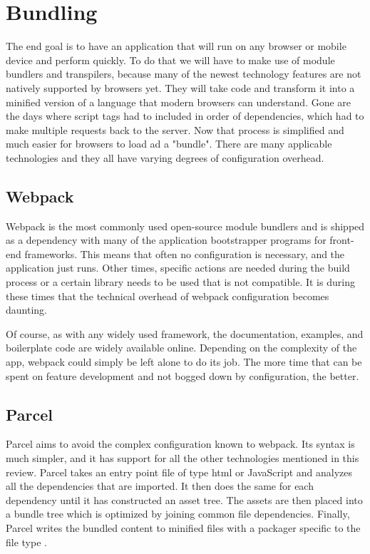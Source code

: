 \documentclass[draftclsnofoot,onecolumn,journal,letterpaper,compsoc,10pt]{IEEEtran}
\begin{document}
    \section{Bundling}
    The end goal is to have an application that will run on any browser or mobile device and perform quickly. To do that we will have to make use of module bundlers and transpilers, because many of the newest technology features are not natively supported by browsers yet. They will take code and transform it into a minified version of a language that modern browsers can understand. Gone are the days where script tags had to included in order of dependencies, which had to make multiple requests back to the server. Now that process is simplified and much easier for browsers to load ad a "bundle". There are many applicable technologies and they all have varying degrees of configuration overhead. 
        \subsection{Webpack}
        Webpack is the most commonly used open-source module bundlers and is shipped as a dependency with many of the application bootstrapper programs for front-end frameworks. This means that often no configuration is necessary, and the application just runs. Other times, specific actions are needed during the build process or a certain library needs to be used that is not compatible. It is during these times that the technical overhead of webpack configuration becomes daunting.
        
        Of course, as with any widely used framework, the documentation, examples, and boilerplate code are widely available online. Depending on the complexity of the app, webpack could simply be left alone to do its job. The more time that can be spent on feature development and not bogged down by configuration, the better.

        \subsection{Parcel}
        Parcel aims to avoid the complex configuration known to webpack. Its syntax is much simpler, and it has support for all the other technologies mentioned in this review. Parcel takes an entry point file of type html or JavaScript and analyzes all the dependencies that are imported. It then does the same for each dependency until it has constructed an asset tree. The assets are then placed into a bundle tree which is optimized by joining common file dependencies. Finally, Parcel writes the bundled content to minified files with a packager specific to the file type \cite{parcel}.
        
\end{document}
